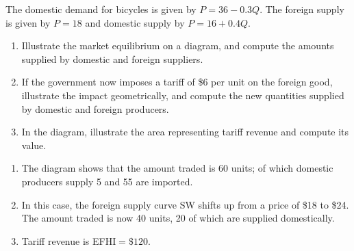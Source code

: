\begin{enumialphparenastyle}
\begin{ex}\label{ex:ch15ex3}
The domestic demand for bicycles is given by $P=36-0.3Q$. The foreign supply is given by $P=18$ and domestic supply by $P=16+0.4Q$.
\begin{enumerate}
\item  Illustrate the market equilibrium on a diagram, and compute the amounts supplied by domestic and foreign suppliers.
\item  If the government now imposes a tariff of \$6 per unit on the foreign good, illustrate the impact geometrically, and compute the new quantities supplied by domestic and foreign producers.
\item  In the diagram, illustrate the area representing tariff revenue and compute its value.
\end{enumerate}
\begin{sol}
\begin{enumerate}
	\item	The diagram shows that the amount traded is 60 units; of which domestic producers supply 5 and 55 are imported.
	\item	In this case, the foreign supply curve SW shifts up from a price of \$18 to \$24. The amount traded is now 40 units, 20 of which are supplied domestically.
	\item	Tariff revenue is EFHI$=\$120$.
\end{enumerate}
\begin{center}
\end{center}
\end{sol}
\end{ex}
\end{enumialphparenastyle}
